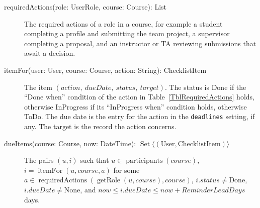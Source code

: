 \documentclass[12pt, titlepage]{article}
\begin{document}
\begin{description}
    \item[requiredActions(role: UserRole, course: Course): List] The required actions of a role in a course,
    for example a student completing a profile and submitting the team project,
    a supervisor completing a proposal, and an instructor or TA reviewing submissions that await a decision.
    \item[itemFor(user: User, course: Course, action: String): ChecklistItem] The item
    $(action,\ dueDate,\ status,\ target)$. The status is Done if the ``Done when'' condition of the
    action in Table~\ref{TblRequiredActions} holds, otherwise InProgress if its ``InProgress when'' condition holds,
    otherwise ToDo. The due date is the entry for the action in the \texttt{deadlines} setting, if any.
    The target is the record the action concerns.
    \item[dueItems(course: Course, now: DateTime): $\operatorname{Set}\langle(\text{User},\text{ChecklistItem})\rangle$]
    The pairs $(u,i)$ such that $u\in\operatorname{participants}(course)$, $i=\operatorname{itemFor}(u,course,a)$ for
    some $a\in\operatorname{requiredActions}(\operatorname{getRole}(u,course),course)$, $i.status\ne\text{Done}$, $i.dueDate\ne\text{None}$,
    and $now\le i.dueDate\le now+\mathit{ReminderLeadDays}$ days.
\end{description}
\end{document}
